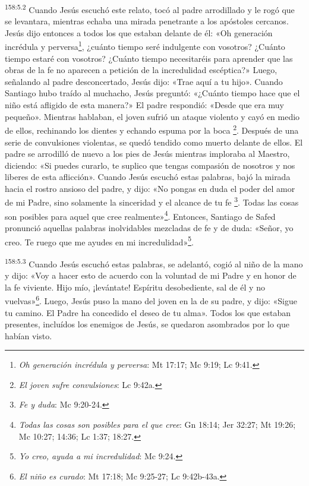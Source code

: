 \par
\textsuperscript{158:5.2} Cuando Jesús escuchó este relato, tocó al padre arrodillado y le rogó que se levantara, mientras echaba una mirada penetrante a los apóstoles cercanos. Jesús dijo entonces a todos los que estaban delante de él: «Oh generación incrédula y perversa\footnote{\textit{Oh generación incrédula y perversa}: Mt 17:17; Mc 9:19; Lc 9:41.}, ¿cuánto tiempo seré indulgente con vosotros? ¿Cuánto tiempo estaré con vosotros? ¿Cuánto tiempo necesitaréis para aprender que las obras de la fe no aparecen a petición de la incredulidad escéptica?» Luego, señalando al padre desconcertado, Jesús dijo: «Trae aquí a tu hijo». Cuando Santiago hubo traído al muchacho, Jesús preguntó: «¿Cuánto tiempo hace que el niño está afligido de esta manera?» El padre respondió: «Desde que era muy pequeño». Mientras hablaban, el joven sufrió un ataque violento y cayó en medio de ellos, rechinando los dientes y echando espuma por la boca \footnote{\textit{El joven sufre convulsiones}: Lc 9:42a.}. Después de una serie de convulsiones violentas, se quedó tendido como muerto delante de ellos. El padre se arrodilló de nuevo a los pies de Jesús mientras imploraba al Maestro, diciendo: «Si puedes curarlo, te suplico que tengas compasión de nosotros y nos liberes de esta aflicción». Cuando Jesús escuchó estas palabras, bajó la mirada hacia el rostro ansioso del padre, y dijo: «No pongas en duda el poder del amor de mi Padre, sino solamente la sinceridad y el alcance de tu fe \footnote{\textit{Fe y duda}: Mc 9:20-24.}. Todas las cosas son posibles para aquel que cree realmente»\footnote{\textit{Todas las cosas son posibles para el que cree}: Gn 18:14; Jer 32:27; Mt 19:26; Mc 10:27; 14:36; Lc 1:37; 18:27.}. Entonces, Santiago de Safed pronunció aquellas palabras inolvidables mezcladas de fe y de duda: «Señor, yo creo. Te ruego que me ayudes en mi incredulidad»\footnote{\textit{Yo creo, ayuda a mi incredulidad}: Mc 9:24.}.

\par
\textsuperscript{158:5.3} Cuando Jesús escuchó estas palabras, se adelantó, cogió al niño de la mano y dijo: «Voy a hacer esto de acuerdo con la voluntad de mi Padre y en honor de la fe viviente. Hijo mío, ¡levántate! Espíritu desobediente, sal de él y no vuelvas»\footnote{\textit{El niño es curado}: Mt 17:18; Mc 9:25-27; Lc 9:42b-43a.}. Luego, Jesús puso la mano del joven en la de su padre, y dijo: «Sigue tu camino. El Padre ha concedido el deseo de tu alma». Todos los que estaban presentes, incluídos los enemigos de Jesús, se quedaron asombrados por lo que habían visto.


